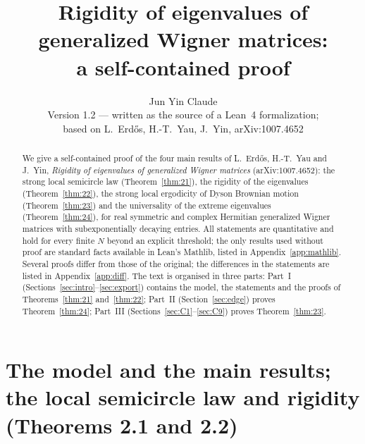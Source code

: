 \documentclass[11pt]{article}
\numberwithin{equation}{section}
\theoremstyle{definition}
\theoremstyle{plain}
\theoremstyle{definition}
\theoremstyle{plain}
\begin{document}
\title{Rigidity of eigenvalues of generalized Wigner matrices:\\ a self-contained proof}
\author{Jun Yin \quad Claude\\[1.5ex] \normalsize Version 1.2 --- written as the source of a Lean~4 formalization;\\ \normalsize based on L.~Erd\H{o}s, H.-T.~Yau, J.~Yin, arXiv:1007.4652}
\date{}
\maketitle

\begin{abstract}
We give a self-contained proof of the four main results of L.~Erd\H{o}s, H.-T.~Yau and J.~Yin, \emph{Rigidity of eigenvalues of generalized Wigner matrices}
(arXiv:1007.4652): the strong local semicircle law (Theorem~\ref{thm:21}), the rigidity of the eigenvalues (Theorem~\ref{thm:22}), the strong local ergodicity of
Dyson Brownian motion (Theorem~\ref{thm:23}) and the universality of the extreme eigenvalues (Theorem~\ref{thm:24}), for real symmetric and complex Hermitian
generalized Wigner matrices with subexponentially decaying entries. All statements are quantitative and hold for every finite $N$ beyond an explicit threshold;
the only results used without proof are standard facts available in Lean's Mathlib, listed in Appendix~\ref{app:mathlib}. Several proofs differ from those of the
original; the differences in the statements are listed in Appendix~\ref{app:diff}.
The text is organised in three parts: Part~I (Sections~\ref{sec:intro}--\ref{sec:export}) contains the model, the statements and the proofs of Theorems~\ref{thm:21} and~\ref{thm:22};
Part~II (Section~\ref{sec:edge}) proves Theorem~\ref{thm:24}; Part~III (Sections~\ref{sec:C1}--\ref{sec:C9}) proves Theorem~\ref{thm:23}.
\end{abstract}

\tableofcontents

\clearpage
\part[The model and the main results; the local semicircle law and rigidity (Theorems 2.1, 2.2)]{The model and the main results;\\ the local semicircle law and rigidity (Theorems 2.1 and 2.2)}










\end{document}
